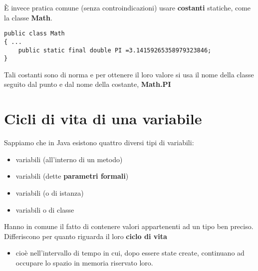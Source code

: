 \begin{frame}[fragile]
\`E invece pratica comune (senza controindicazioni) usare \textbf{costanti} statiche, come la classe \textbf{\alert{Math}}.
\begin{lstlisting}
public class Math
{ ...
    public static final double PI =3.14159265358979323846;
}
\end{lstlisting}
\begin{block}{}
Tali costanti sono di norma \textbf{} e per ottenere il loro valore si usa il nome della classe seguito dal 
punto e dal nome della costante, \textbf{\alert{Math.PI}}
\end{block}
\end{frame}


\section*{Cicli di vita di una variabile}
\begin{frame}
\begin{block}{}
Sappiamo che in Java esistono quattro diversi tipi di variabili:
\begin{itemize}
\item variabili \textbf{} (all'interno di un metodo)
\item variabili \textbf{} (dette \textbf{parametri formali})
\item variabili \textbf{} (o di istanza)
\item variabili \textbf{} o di classe
\end{itemize}
\end{block}
\begin{block}{}
Hanno in comune il fatto di contenere valori appartenenti ad un tipo ben preciso. Differiscono per quanto riguarda il loro 
\textbf{\alert{ciclo di vita}}
\begin{itemize}
\item cioè nell'intervallo di tempo in cui, dopo essere state create, continuano ad occupare lo spazio in memoria riservato loro.
\end{itemize}
\end{block}
\end{frame}

